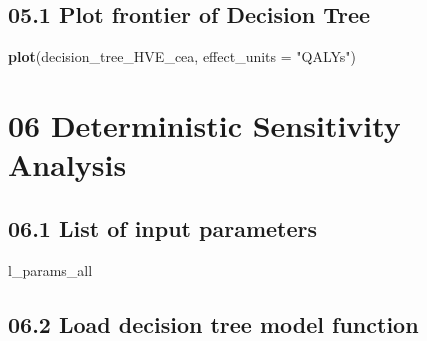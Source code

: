 \documentclass[]{article}
\newenvironment{Shaded}{\begin{snugshade}}{\end{snugshade}}
\newcommand{\KeywordTok}[1]{\textcolor[rgb]{0.13,0.29,0.53}{\textbf{#1}}}
\newcommand{\DataTypeTok}[1]{\textcolor[rgb]{0.13,0.29,0.53}{#1}}
\newcommand{\StringTok}[1]{\textcolor[rgb]{0.31,0.60,0.02}{#1}}
\newcommand{\CommentTok}[1]{\textcolor[rgb]{0.56,0.35,0.01}{\textit{#1}}}
\newcommand{\OperatorTok}[1]{\textcolor[rgb]{0.81,0.36,0.00}{\textbf{#1}}}
\newcommand{\NormalTok}[1]{#1}
\begin{document}
\begin{Shaded}
\end{Shaded}

\subsection{05.1 Plot frontier of Decision
Tree}\label{plot-frontier-of-decision-tree}

\begin{Shaded}
\begin{Highlighting}[]
\KeywordTok{plot}\NormalTok{(decision_tree_HVE_cea, }\DataTypeTok{effect_units =} \StringTok{"QALYs"}\NormalTok{)}
\end{Highlighting}
\end{Shaded}

\section{06 Deterministic Sensitivity
Analysis}\label{deterministic-sensitivity-analysis}

\subsection{06.1 List of input
parameters}\label{list-of-input-parameters}

\begin{Shaded}
\begin{Highlighting}[]
\NormalTok{l_params_all }
\end{Highlighting}
\end{Shaded}

\subsection{06.2 Load decision tree model
function}\label{load-decision-tree-model-function}
\end{document}
